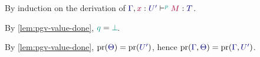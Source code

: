 \proof
\label{prf:lem-pgv-substitution}
By induction on the derivation of $\tseq[\cs{p}]{\ty{\Gamma},\tmty{x}{U'}}{M}{T}$.

\begin{case*}
  By \cref{lem:pgv-value-done}, $\cs{q}=\cs{\pbot}$.
  \begin{mathpar}
  \end{mathpar}
\end{case*}
\begin{case*}
  By \cref{lem:pgv-value-done}, $\minpr(\ty{\Theta})=\minpr(\ty{U'})$, hence $\minpr(\ty{\Gamma},\ty{\Theta})=\minpr(\ty{\Gamma},\ty{U'})$.
  \begin{mathpar}
  \end{mathpar}
\end{case*}
